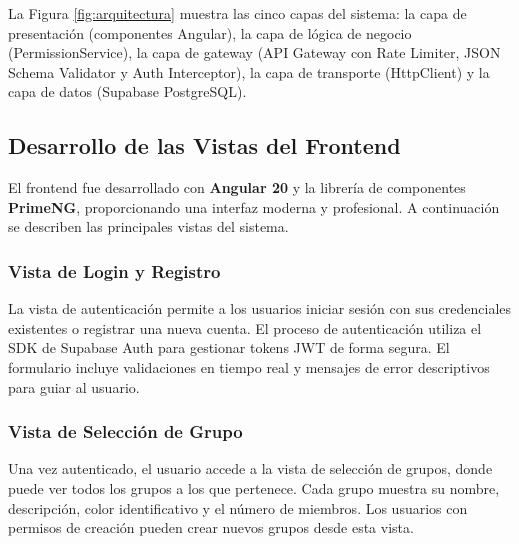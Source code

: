 \documentclass[12pt,a4paper]{article}
\begin{document}
La Figura \ref{fig:arquitectura} muestra las cinco capas del sistema: la capa de presentación (componentes Angular), la capa de lógica de negocio (PermissionService), la capa de gateway (API Gateway con Rate Limiter, JSON Schema Validator y Auth Interceptor), la capa de transporte (HttpClient) y la capa de datos (Supabase PostgreSQL).

\subsection{Desarrollo de las Vistas del Frontend}

El frontend fue desarrollado con \textbf{Angular 20} y la librería de componentes \textbf{PrimeNG}, proporcionando una interfaz moderna y profesional. A continuación se describen las principales vistas del sistema.

\subsubsection{Vista de Login y Registro}

La vista de autenticación permite a los usuarios iniciar sesión con sus credenciales existentes o registrar una nueva cuenta. El proceso de autenticación utiliza el SDK de Supabase Auth para gestionar tokens JWT de forma segura. El formulario incluye validaciones en tiempo real y mensajes de error descriptivos para guiar al usuario.


\subsubsection{Vista de Selección de Grupo}

Una vez autenticado, el usuario accede a la vista de selección de grupos, donde puede ver todos los grupos a los que pertenece. Cada grupo muestra su nombre, descripción, color identificativo y el número de miembros. Los usuarios con permisos de creación pueden crear nuevos grupos desde esta vista.

\end{document}
